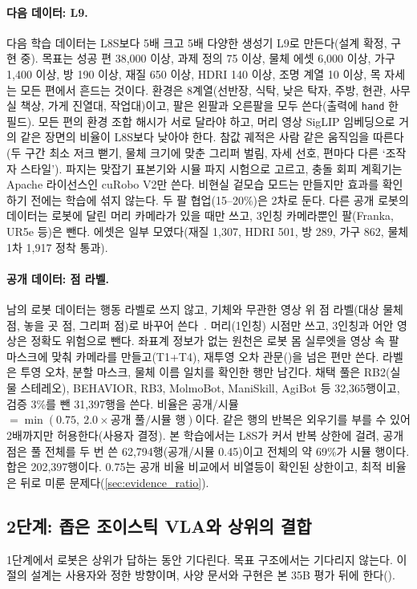 \paragraph{다음 데이터: L9.} 다음 학습 데이터는 L8S보다 5배 크고 5배 다양한 생성기 L9로 만든다(설계 확정, 구현 중). 목표는 성공 편 38,000 이상, 과제 정의 75 이상, 물체 에셋 6,000 이상, 가구 1,400 이상, 방 190 이상, 재질 650 이상, HDRI 140 이상, 조명 계열 10 이상, 목 자세는 모든 편에서 흔드는 것이다. 환경은 8계열(선반장, 식탁, 낮은 탁자, 주방, 현관, 사무실 책상, 가게 진열대, 작업대)이고, 팔은 왼팔과 오른팔을 모두 쓴다(출력에 \texttt{hand} 한 필드). 모든 편의 환경 조합 해시가 서로 달라야 하고, 머리 영상 SigLIP 임베딩으로 거의 같은 장면의 비율이 L8S보다 낮아야 한다. 참값 궤적은 사람 같은 움직임을 따른다(두 구간 최소 저크 뻗기, 물체 크기에 맞춘 그리퍼 벌림, 자세 선호, 편마다 다른 `조작자 스타일'). 파지는 맞잡기 표본기와 시뮬 파지 시험으로 고르고, 충돌 회피 계획기는 Apache 라이선스인 cuRobo V2만 쓴다. 비현실 겉모습 모드는 만들지만 효과를 확인하기 전에는 학습에 섞지 않는다. 두 팔 협업(15--20\%)은 2차로 둔다. 다른 공개 로봇의 데이터는 로봇에 달린 머리 카메라가 있을 때만 쓰고, 3인칭 카메라뿐인 팔(Franka, UR5e 등)은 뺀다. 에셋은 일부 모였다(재질 1,307, HDRI 501, 방 289, 가구 862, 물체 1차 1,917 정착 통과).

\label{sec:data}
\paragraph{공개 데이터: 점 라벨.} 남의 로봇 데이터는 행동 라벨로 쓰지 않고, 기체와 무관한 영상 위 점 라벨(대상 물체 점, 놓을 곳 점, 그리퍼 점)로 바꾸어 쓴다~\cite{molmoact2026}. 머리(1인칭) 시점만 쓰고, 3인칭과 어안 영상은 정확도 위험으로 뺀다. 좌표계 정보가 없는 원천은 로봇 몸 실루엣을 영상 속 팔 마스크에 맞춰 카메라를 만들고(T1+T4), 재투영 오차 관문()을 넘은 편만 쓴다. 라벨은 투영 오차, 분할 마스크, 물체 이름 일치를 확인한 행만 남긴다. 채택 풀은 RB2(실물 스테레오), BEHAVIOR, RB3, MolmoBot, ManiSkill, AgiBot 등 32,365행이고, 검증 3\%를 뺀 31,397행을 쓴다. 비율은 공개/시뮬 $=\min(0.75,\ 2.0\times\text{공개 풀}/\text{시뮬 행})$이다. 같은 행의 반복은 외우기를 부를 수 있어 2배까지만 허용한다(사용자 결정). 본 학습에서는 L8S가 커서 반복 상한에 걸려, 공개 점은 풀 전체를 두 번 쓴 62,794행(공개/시뮬 0.45)이고 전체의 약 69\%가 시뮬 행이다. 합은 202,397행이다. 0.75는 공개 비율 비교에서 비열등이 확인된 상한이고, 최적 비율은 뒤로 미룬 문제다(\cref{sec:evidence_ratio}).

\subsection{2단계: 좁은 조이스틱 VLA와 상위의 결합}
\label{sec:extension}
1단계에서 로봇은 상위가 답하는 동안 기다린다. 목표 구조에서는 기다리지 않는다. 이 절의 설계는 사용자와 정한 방향이며, 사양 문서와 구현은 본 35B 평가 뒤에 한다().

